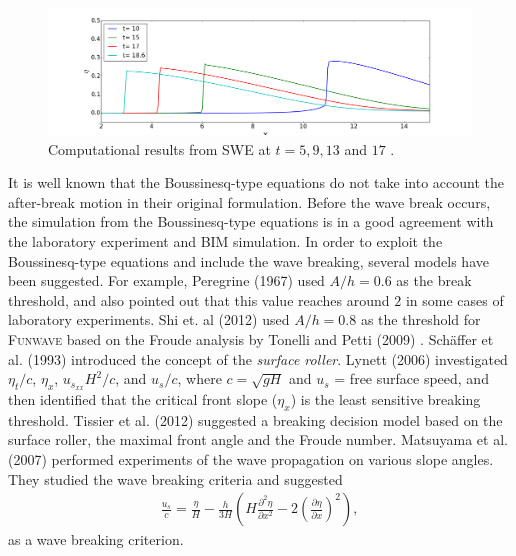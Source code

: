 \documentclass[review]{elsarticle}
\begin{document}
\begin{figure}[!htb]
\centering
\includegraphics[width=\textwidth]{_fig/sw_dx05_time_series.png}
\caption{Computational results from SWE at $t=5,9,13$ and $17$ .  }
\label{fig:sw_timeseries}
\end{figure}


It is well known that the Boussinesq-type equations 
do not take into account the after-break motion
in their original formulation. 
Before the wave break occurs, 
the simulation from the Boussinesq-type equations is
in a good agreement with the laboratory experiment and BIM simulation.
In order to exploit the Boussinesq-type equations
and include the wave breaking,
several models have been suggested. 
For example, 
Peregrine (1967) \citep{peregrine1967long} used $A/h=0.6$ 
as the break threshold, and also pointed out that
this value reaches around $2$ in some cases of laboratory experiments. 
Shi et. al (2012) \citep{shi2012high} used 
$A/h = 0.8$ as the threshold 
for \textsc{Funwave} based on the Froude analysis 
by Tonelli and Petti (2009) \citep{tonelli2009hybrid}.
Sch{\"a}ffer et al. (1993) \cite{schaffer1993boussinesq} 
introduced the concept of the {\em surface roller}.
Lynett (2006) \cite{lynett2006nearshore} 
investigated $\eta_t/c$, $\eta_x$, $u_{s_{xx}} H^2/c$, and $u_s/c$, 
where $c=\sqrt{gH}$ and $u_s$ = free surface speed,
and then identified that the critical front slope ($\eta_x$) 
is the least sensitive breaking threshold. 
Tissier et al. (2012) \cite{tissier2012new} suggested
a breaking decision model based on the surface roller,
the maximal front angle and the Froude number.
Matsuyama et al. (2007) \cite{matsuyama2007study} performed experiments
of the wave propagation on various slope angles. 
They studied the wave breaking criteria and suggested 
\begin{align*}
\frac{u_s}{c} = \frac{\eta}{H} - \frac{h}{3H}
\left(
H\frac{\partial^2 \eta}{\partial x^2} - 2 \left(\frac{\partial \eta}{\partial x} \right)^2
\right),
\end{align*}
as a wave breaking criterion.
\end{document}
